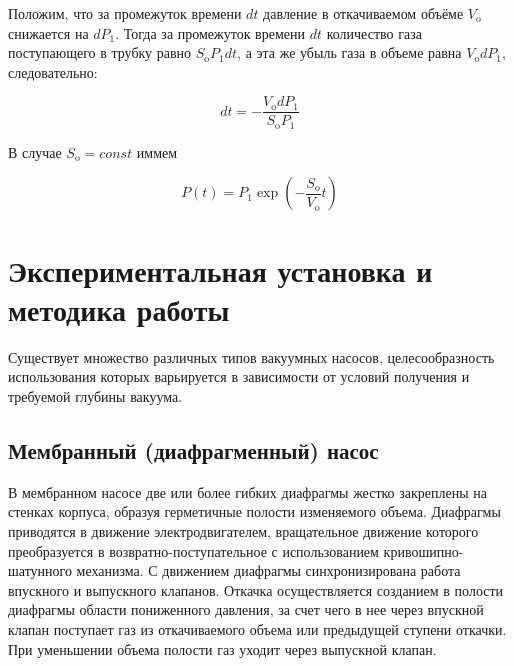 \documentclass[a4paper,12pt]{article}
\begin{document}
Положим, что за промежуток времени $dt$ давление
в откачиваемом объёме $V_{\text{o}}$ снижается на $dP_1$. Тогда за промежуток времени $dt$ количество газа поступающего в трубку равно $S_{\text{o}} P_1 dt$, а эта же
убыль газа в объеме равна $V_{\text{o}} dP_1$, следовательно:

\begin{equation}
	dt = - \frac{V_{\text{o}} dP_1}{S_{\text{o}}P_1}
\end{equation}

В случае $S_{\text{o}} = const$ иммем 

\begin{equation}
	P(t) = P_1 \exp \left( - \frac{S_{\text{o}}}{V_{\text{o}}}t \right)
\end{equation}


\section{Экспериментальная установка и методика работы}

Существует множество различных типов вакуумных насосов, целесообразность использования которых варьируется в зависимости от условий получения и требуемой глубины вакуума.

\subsection{Мембранный (диафрагменный) насос}

В мембранном насосе две или более гибких диафрагмы жестко закреплены на стенках корпуса, образуя герметичные полости изменяемого объема. Диафрагмы приводятся в движение
электродвигателем, вращательное движение которого преобразуется
в возвратно-поступательное с использованием кривошипно-шатунного
механизма. С движением диафрагмы синхронизирована работа
впускного и выпускного клапанов. Откачка осуществляется созданием
в полости диафрагмы области пониженного давления, за счет чего в нее через впускной клапан поступает газ из откачиваемого объема или предыдущей ступени откачки. При уменьшении объема полости газ уходит через выпускной клапан.
\end{document}

